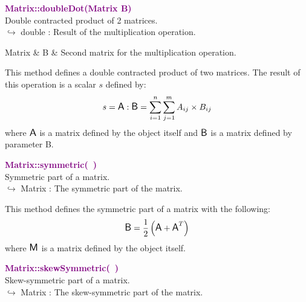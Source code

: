 \textcolor{purple}{\textbf{Matrix::doubleDot(Matrix B)}}\label{Matrix::doubleDot(Matrix B)}\\
Double contracted product of 2 matrices.\\ \hspace*{10mm}$\hookrightarrow$ double : Result of the multiplication operation.

\begin{tcolorbox}[width=\textwidth,myArgs,tabularx={ll|R}]
Matrix & B & Second matrix for the multiplication operation.
\end{tcolorbox}

This method defines a double contracted product of two matrices.
The result of this operation is a scalar $s$ defined by:
\begin{equation*}
s = \mbox{\large\ensuremath{\mathsf{A}}} : \mbox{\large\ensuremath{\mathsf{B}}} = \sum_{i=1}^{n} \sum_{j=1}^{m} A_{ij}\times B_{ij}
\end{equation*}
where $\mbox{\large\ensuremath{\mathsf{A}}}$ is a matrix defined by the object itself and $\mbox{\large\ensuremath{\mathsf{B}}}$ is a matrix defined by parameter B.

\textcolor{purple}{\textbf{Matrix::symmetric(~)}}\label{Matrix::symmetric()}\\
Symmetric part of a matrix.\\ \hspace*{10mm}$\hookrightarrow$ Matrix : The symmetric part of the matrix.

This method defines the symmetric part of a matrix with the following:
\begin{equation*}
\mbox{\large\ensuremath{\mathsf{B}}} = \frac{1}{2} \left( \mbox{\large\ensuremath{\mathsf{A}}} + \mbox{\large\ensuremath{\mathsf{A}}}^T \right)
\end{equation*}
where $\mbox{\large\ensuremath{\mathsf{M}}}$ is a matrix defined by the object itself.

\textcolor{purple}{\textbf{Matrix::skewSymmetric(~)}}\label{Matrix::skewSymmetric()}\\
Skew-symmetric part of a matrix.\\ \hspace*{10mm}$\hookrightarrow$ Matrix : The skew-symmetric part of the matrix.

